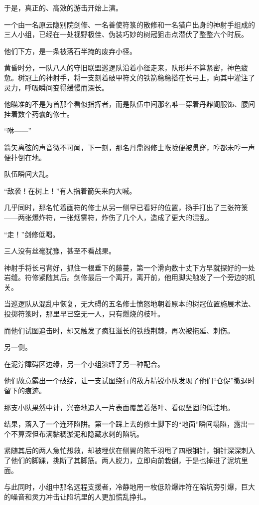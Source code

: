 \vspace{2em}

于是，真正的、高效的游击开始上演。

一个由一名原云隐别院剑修、一名善使符箓的散修和一名猎户出身的神射手组成的三人小组，已经在一处视野极佳、伪装巧妙的树冠狙击点潜伏了整整六个时辰。

他们下方，是一条被落石半掩的废弃小径。

黄昏时分，一队八人的守旧联盟巡逻队沿着小径走来，队形并不算紧密，神色疲惫。树冠上的神射手，将一支刻着破甲符文的铁箭稳稳搭在长弓上，向其中灌注了灵力，呼吸瞬间变得缓慢而深长。

他瞄准的不是为首那个看似指挥者，而是队伍中间那名唯一穿着丹鼎阁服饰、腰间挂着数个药囊的修士。

“咻——”

箭矢离弦的声音微不可闻，下一刻，那名丹鼎阁修士喉咙便被贯穿，哼都未哼一声便扑倒在地。

队伍瞬间大乱。

“敌袭！在树上！”有人指着箭矢来向大喊。

几乎同时，那名忙着画符的修士从另一侧早已看好的位置，扬手打出了三张符箓——两张爆炸符，一张烟雾符，炸伤了几个人，造成了更大的混乱。

“走！”剑修低喝。

三人没有丝毫犹豫，甚至不看战果。

神射手将长弓背好，抓住一根垂下的藤蔓，第一个滑向数十丈下方早就探好的一处岩缝。符修紧随其后。剑修最后一个离开，离开前，他用脚尖触发了一个旁边的机关。

当巡逻队从混乱中恢复，无大碍的五名修士愤怒地朝着原本的树冠位置施展术法、投掷符箓时，那里早已空无一人，只有燃烧的枝叶。

而他们试图追击时，却又触发了疯狂滋长的铁线荆棘，再次被拖延、刺伤。

另一侧。

在泥泞障碍区边缘，另一个小组演绎了另一种配合。

他们故意露出一个破绽，让一支试图绕行的敌方精锐小队发现了他们“仓促”撤退时留下的痕迹。

那支小队果然中计，兴奋地追入一片表面覆盖着落叶、看似坚固的低洼地。

结果，落入了一个连环陷阱。第一个踩上去的修士脚下的“地面”瞬间塌陷，露出一个不算深但布满黏稠淤泥和隐藏水刺的陷坑。

紧随其后的两人急忙想救，却被埋伏在侧翼的陈千羽甩了四根钢针，钢针深深刺入了他们的脚踝，挑断了其脚筋。两人脱力，立即向前栽倒，于是也掉进了泥坑里面。

与此同时，小组中那名远程支援者，冷静地用一枚低阶爆炸符在陷坑旁引爆，巨大的噪音和灵力冲击让陷坑里的人更加慌乱挣扎。

